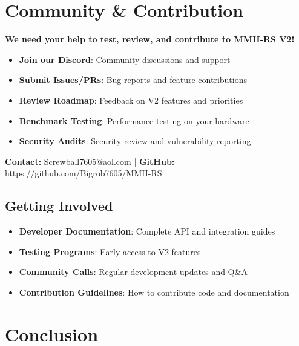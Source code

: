 \documentclass[12pt,a4paper]{article}
\makeatletter
\newcommand{\email}{Screwball7605@aol.com}
\newcommand{\github}{https://github.com/Bigrob7605/MMH-RS}
\makeatother
\begin{document}
\section{Community \& Contribution}

\begin{tcolorbox}[colback=orange!10,colframe=orange!50,title=\textbf{Help Us Build MMH-RS V2}]
\textbf{We need your help to test, review, and contribute to MMH-RS V2!}

\begin{itemize}
    \item \textbf{Join our Discord}: Community discussions and support
    \item \textbf{Submit Issues/PRs}: Bug reports and feature contributions
    \item \textbf{Review Roadmap}: Feedback on V2 features and priorities
    \item \textbf{Benchmark Testing}: Performance testing on your hardware
    \item \textbf{Security Audits}: Security review and vulnerability reporting
\end{itemize}

\textbf{Contact:} \email{} | \textbf{GitHub:} \github
\end{tcolorbox}

\subsection{Getting Involved}
\begin{itemize}
    \item \textbf{Developer Documentation}: Complete API and integration guides
    \item \textbf{Testing Programs}: Early access to V2 features
    \item \textbf{Community Calls}: Regular development updates and Q\&A
    \item \textbf{Contribution Guidelines}: How to contribute code and documentation
\end{itemize}

\section{Conclusion}
\end{document}
